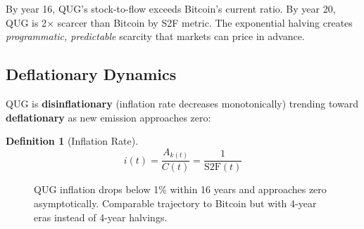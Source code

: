 \documentclass[11pt,a4paper]{article}
\newtheorem{definition}[theorem]{Definition}
\begin{document}
\begin{tcolorbox}[colback=yellow!5,colframe=quggold,title=\textbf{S2F Implication}]
By year 16, QUG's stock-to-flow exceeds Bitcoin's current ratio. By year 20, QUG is 2$\times$ scarcer than Bitcoin by S2F metric. The exponential halving creates \emph{programmatic, predictable} scarcity that markets can price in advance.
\end{tcolorbox}

\subsection{Deflationary Dynamics}

QUG is \textbf{disinflationary} (inflation rate decreases monotonically) trending toward \textbf{deflationary} as new emission approaches zero:

\begin{definition}[Inflation Rate]
\begin{equation}
    i(t) = \frac{A_{k(t)}}{C(t)} = \frac{1}{\text{S2F}(t)}
\end{equation}
\end{definition}

\begin{figure}[H]
\centering
{}
\caption{QUG inflation drops below 1\% within 16 years and approaches zero asymptotically. Comparable trajectory to Bitcoin but with 4-year eras instead of 4-year halvings.}
\end{figure}
\end{document}
